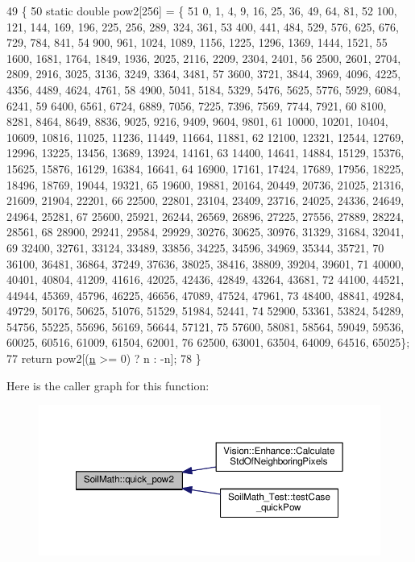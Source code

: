 \begin{DoxyCode}
49                                        \{
50   \textcolor{keyword}{static} \textcolor{keywordtype}{double} pow2[256] = \{
51       0,     1,     4,     9,     16,    25,    36,    49,    64,    81,
52       100,   121,   144,   169,   196,   225,   256,   289,   324,   361,
53       400,   441,   484,   529,   576,   625,   676,   729,   784,   841,
54       900,   961,   1024,  1089,  1156,  1225,  1296,  1369,  1444,  1521,
55       1600,  1681,  1764,  1849,  1936,  2025,  2116,  2209,  2304,  2401,
56       2500,  2601,  2704,  2809,  2916,  3025,  3136,  3249,  3364,  3481,
57       3600,  3721,  3844,  3969,  4096,  4225,  4356,  4489,  4624,  4761,
58       4900,  5041,  5184,  5329,  5476,  5625,  5776,  5929,  6084,  6241,
59       6400,  6561,  6724,  6889,  7056,  7225,  7396,  7569,  7744,  7921,
60       8100,  8281,  8464,  8649,  8836,  9025,  9216,  9409,  9604,  9801,
61       10000, 10201, 10404, 10609, 10816, 11025, 11236, 11449, 11664, 11881,
62       12100, 12321, 12544, 12769, 12996, 13225, 13456, 13689, 13924, 14161,
63       14400, 14641, 14884, 15129, 15376, 15625, 15876, 16129, 16384, 16641,
64       16900, 17161, 17424, 17689, 17956, 18225, 18496, 18769, 19044, 19321,
65       19600, 19881, 20164, 20449, 20736, 21025, 21316, 21609, 21904, 22201,
66       22500, 22801, 23104, 23409, 23716, 24025, 24336, 24649, 24964, 25281,
67       25600, 25921, 26244, 26569, 26896, 27225, 27556, 27889, 28224, 28561,
68       28900, 29241, 29584, 29929, 30276, 30625, 30976, 31329, 31684, 32041,
69       32400, 32761, 33124, 33489, 33856, 34225, 34596, 34969, 35344, 35721,
70       36100, 36481, 36864, 37249, 37636, 38025, 38416, 38809, 39204, 39601,
71       40000, 40401, 40804, 41209, 41616, 42025, 42436, 42849, 43264, 43681,
72       44100, 44521, 44944, 45369, 45796, 46225, 46656, 47089, 47524, 47961,
73       48400, 48841, 49284, 49729, 50176, 50625, 51076, 51529, 51984, 52441,
74       52900, 53361, 53824, 54289, 54756, 55225, 55696, 56169, 56644, 57121,
75       57600, 58081, 58564, 59049, 59536, 60025, 60516, 61009, 61504, 62001,
76       62500, 63001, 63504, 64009, 64516, 65025\};
77   \textcolor{keywordflow}{return} pow2[(\hyperlink{_comparision_pictures_2_createtest_image_8m_aeab71244afb687f16d8c4f5ee9d6ef0e}{n} >= 0) ? n : -n];
78 \}
\end{DoxyCode}


Here is the caller graph for this function\+:\nopagebreak
\begin{figure}[H]
\begin{center}
\leavevmode
\includegraphics[width=350pt]{namespace_soil_math_a69d186af0e164a5f98c42985aabec919_icgraph}
\end{center}
\end{figure}


